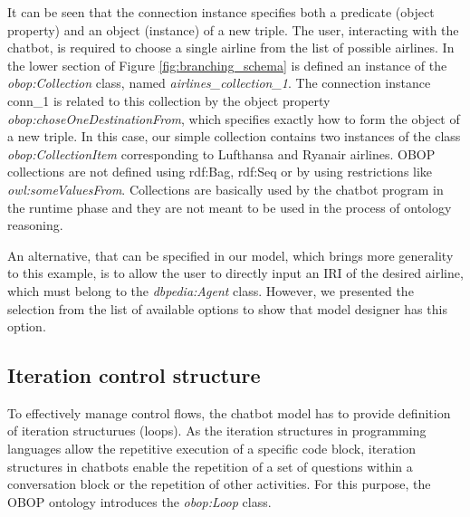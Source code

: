 \documentclass[runningheads]{llncs}
\begin{document}
It can be seen that the connection instance specifies both a predicate (object property) and an object (instance) of a new triple. The user, interacting with the chatbot, is required to choose a single airline from the list of possible airlines. In the lower section of Figure \ref{fig:branching_schema} is defined an instance of the \textit{obop:Collection} class, named \textit{airlines\_collection\_1}. The connection instance conn\_1 is related to this collection by the object property \textit{obop:choseOneDestinationFrom}, which specifies exactly how to form the object of a new triple. In this case, our simple collection contains two instances of the class \textit{obop:CollectionItem} corresponding to Lufthansa and Ryanair airlines. 
OBOP collections are not defined using rdf:Bag, rdf:Seq or by using restrictions like \textit{owl:someValuesFrom}. Collections are basically used by the chatbot program in the runtime phase and they are not meant to be used in the process of ontology reasoning.     

An alternative, that can be specified in our model, which brings more generality to this example,  is to allow the user to directly input an IRI of the desired airline, which must belong to the \textit{dbpedia:Agent} class. However, we presented the selection from the list of available options to show that model designer has this option.

\FloatBarrier 
\subsection {Iteration control structure}
To effectively manage control flows, the chatbot model has to provide definition of iteration structurues (loops). As the iteration structures in programming languages allow the repetitive execution of a specific code block, iteration structures in chatbots enable the repetition of a set of questions within a conversation block or the repetition of other activities. For this purpose, the OBOP ontology introduces the \textit{obop:Loop} class. 
\end{document}
